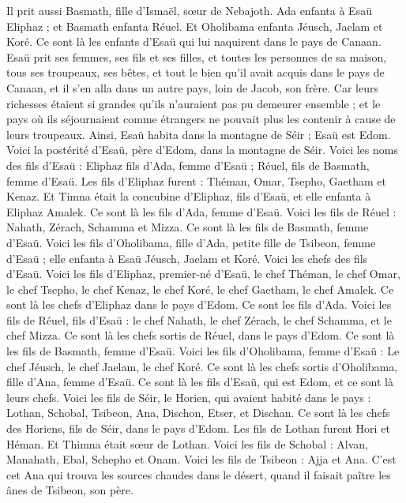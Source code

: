 \begin{multicols}{2}
Il prit aussi Basmath, fille d'Ismaël, sœur de Nebajoth.
Ada enfanta à Esaü Eliphaz ; et Basmath enfanta Réuel.
Et Oholibama enfanta Jéusch, Jaelam et Koré. Ce sont là les enfants d'Esaü qui lui naquirent dans le pays de Canaan.
Esaü prit ses femmes, ses fils et ses filles, et toutes les personnes de sa maison, tous ses troupeaux, ses bêtes, et tout le bien qu'il avait acquis dans le pays de Canaan, et il s'en alla dans un autre pays, loin de Jacob, son frère.
Car leurs richesses étaient si grandes qu'ils n'auraient pas pu demeurer ensemble ; et le pays où ils séjournaient comme étrangers ne pouvait plus les contenir à cause de leurs troupeaux.
Ainsi, Esaü habita dans la montagne de Séir ; Esaü est Edom.
Voici la postérité d'Esaü, père d'Edom, dans la montagne de Séir.
Voici les noms des fils d'Esaü : Eliphaz fils d'Ada, femme d'Esaü ; Réuel, fils de Basmath, femme d'Esaü.
Les fils d'Eliphaz furent : Théman, Omar, Tsepho, Gaetham et Kenaz.
Et Timna était la concubine d'Eliphaz, fils d'Esaü, et elle enfanta à Eliphaz Amalek. Ce sont là les fils d'Ada, femme d'Esaü.
Voici les fils de Réuel : Nahath, Zérach, Schamma et Mizza. Ce sont là les fils de Basmath, femme d'Esaü.
Voici les fils d'Oholibama, fille d'Ada, petite fille de Tsibeon, femme d'Esaü ; elle enfanta à Esaü Jéusch, Jaelam et Koré.
Voici les chefs des fils d'Esaü. Voici les fils d'Eliphaz, premier-né d'Esaü, le chef Théman, le chef Omar, le chef Tsepho, le chef Kenaz,
le chef Koré, le chef Gaetham, le chef Amalek. Ce sont là les chefs d'Eliphaz dans le pays d'Edom. Ce sont les fils d'Ada.
Voici les fils de Réuel, fils d'Esaü : le chef Nahath, le chef Zérach, le chef Schamma, et le chef Mizza. Ce sont là les chefs sortis de Réuel, dans le pays d'Edom. Ce sont là les fils de Basmath, femme d'Esaü.
Voici les fils d'Oholibama, femme d'Esaü : Le chef Jéusch, le chef Jaelam, le chef Koré. Ce sont là les chefs sortis d'Oholibama, fille d'Ana, femme d'Esaü.
Ce sont là les fils d'Esaü, qui est Edom, et ce sont là leurs chefs.
Voici les fils de Séir, le Horien, qui avaient habité dans le pays : Lothan, Schobal, Tsibeon, Ana,
Dischon, Etser, et Dischan. Ce sont là les chefs des Horiens, fils de Séir, dans le pays d'Edom.
Les fils de Lothan furent Hori et Héman. Et Thimna était sœur de Lothan.
Voici les fils de Schobal : Alvan, Manahath, Ebal, Schepho et Onam.
Voici les fils de Tsibeon : Ajja et Ana. C'est cet Ana qui trouva les sources chaudes dans le désert, quand il faisait paître les ânes de Tsibeon, son père.

\end{multicols}
